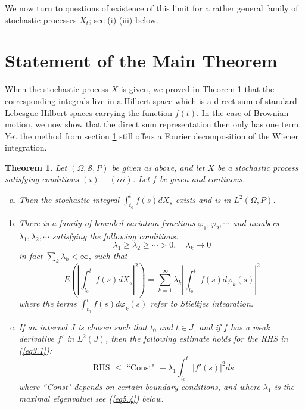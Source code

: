 \documentclass{amsart}
\newtheorem{theorem}{Theorem}[section]
\theoremstyle{definition}
\theoremstyle{remark}
\numberwithin{equation}{section}
\begin{document}
We now turn to questions of existence of this limit for a rather general
family of stochastic processes $X_{t}$; see (i)-(iii) below.

\section{Statement of the Main Theorem}
\label{sec:3}

When the stochastic process $X$ is given, we proved in Theorem \ref{T:3.1} 
that the corresponding integrals live in a Hilbert space which is a direct 
sum of standard Lebesgue Hilbert spaces carrying the function $f(t)$. In 
the case of Brownian motion, we now show that the direct sum representation 
then only has one term. Yet the method from section \ref{sec:3} still offers 
a Fourier decomposition of the Wiener integration.

\begin{theorem}
\label{T:3.1}
  Let $(\Omega, \mathcal{S}, P)$ be given as above, and let $X$ be a 
  stochastic process satisfying conditions $(i)-(iii)$.  Let $f$ be given 
  and continous.
  \begin{enumerate}[(a) ]
    \item Then the stochastic integral $\int_{t_{0}}^{t}f(s)dX_{s}$ exists 
          and is in $L^{2}(\Omega, P)$.
    \item There is a family of bounded variation functions 
          $\varphi_{1}, \varphi_{2}, \cdots $ and numbers 
          $\lambda_{1}, \lambda_{2}, \cdots $ satisfying the following 
          conditions:
          \[
            \lambda_{1} \geq \lambda_{2} \geq \cdots > 0, \quad 
            \lambda_{k} \to 0
          \]
          in fact $\sum_{k}\lambda_{k} < \infty$,
         such that
         \begin{equation}
         
         \label{eq3.1}
           E(\left\vert \int_{t_{0}}^{t}f(s)dX_{s}\right\vert^{2})
           = \sum_{k=1}^{\infty}\lambda_{k} \left\vert 
           \int_{t_{0}}^{t}f(s)d\varphi_{k}(s)\right\vert^{2}
         \end{equation}
         where the terms $\int_{t_{0}}^{t}f(s)d\varphi_{k}(s)$ refer to 
         Stieltjes integration. 
    \item If an interval $J$ is chosen such that $t_{0}$ and $t \in J$, and 
          if $f$ has a weak derivative $f'$ in $L^{2}(J)$, then the following 
          estimate holds for the RHS in (\ref{eq3.1}):
          \begin{equation}
          
          \label{eq3.2}
            \mbox{ RHS } \leq \mbox{ ``Const" } + 
            \lambda_{1}\int_{t_0}^{t}|f'(s)|^{2}ds
          \end{equation}
          where ``Const" depends on certain boundary conditions, and where 
          $\lambda_{1}$ is the maximal eigenvaluel see (\ref{eq5.4}) below.
  \end{enumerate}
\end{theorem}
\end{document}
